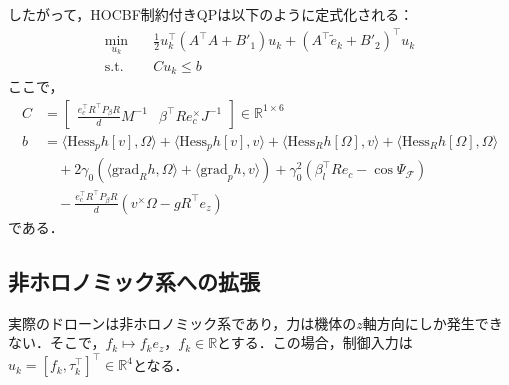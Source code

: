 したがって，HOCBF制約付きQPは以下のように定式化される：
\begin{equation}
\begin{aligned}
\min_{u_k} \quad & \frac{1}{2} u_k^\top (A^\top A + B'_1) u_k + (A^\top \tilde{e}_k + B'_2)^\top u_k \\
\mathrm{s.t.} \quad & C u_k \leq b
\label{eq:single_hocbf_qp}
\end{aligned}
\end{equation}
ここで，
\begin{equation}
\begin{aligned}
C &= \begin{bmatrix} \frac{e_c^\top R^\top P_\beta R}{d} M^{-1} & \beta^\top R e_c^\times J^{-1} \end{bmatrix} \in \mathbb{R}^{1 \times 6} \\
b &= \langle \mathrm{Hess}_p h[v], \Omega \rangle + \langle \mathrm{Hess}_p h[v], v \rangle + \langle \mathrm{Hess}_R h[\Omega], v \rangle + \langle \mathrm{Hess}_R h[\Omega], \Omega \rangle \\
&\quad + 2\gamma_0 (\langle \mathrm{grad}_R h, \Omega \rangle + \langle \mathrm{grad}_p h, v \rangle) + \gamma_0^2 (\beta_l^\top R e_c - \cos\Psi_\mathcal{F}) \\
&\quad - \frac{e_c^\top R^\top P_\beta R}{d} (v^\times \Omega - g R^\top e_z)
\label{eq:single_hocbf_qp_params}
\end{aligned}
\end{equation}
である．

\subsection{非ホロノミック系への拡張}

実際のドローンは非ホロノミック系であり，力は機体の$z$軸方向にしか発生できない．そこで，$f_k \mapsto f_k e_z$，$f_k \in \mathbb{R}$とする．この場合，制御入力は$u_k = [f_k, \tau_k^\top]^\top \in \mathbb{R}^4$となる．

